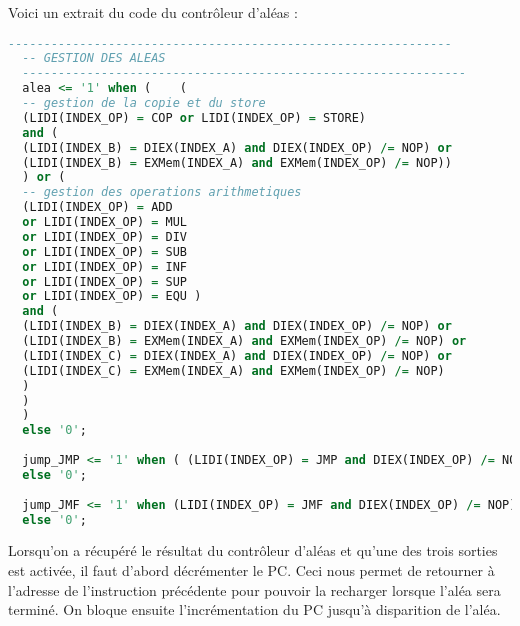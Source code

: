 Voici un extrait du code du contrôleur d'aléas :
\begin{lstlisting}[language=VHDL]
  --------------------------------------------------------------
  -- GESTION DES ALEAS
  --------------------------------------------------------------
  alea <= '1' when (	(
  -- gestion de la copie et du store
  (LIDI(INDEX_OP) = COP or LIDI(INDEX_OP) = STORE)
  and (
  (LIDI(INDEX_B) = DIEX(INDEX_A) and DIEX(INDEX_OP) /= NOP) or
  (LIDI(INDEX_B) = EXMem(INDEX_A) and EXMem(INDEX_OP) /= NOP))
  ) or (
  -- gestion des operations arithmetiques
  (LIDI(INDEX_OP) = ADD
  or LIDI(INDEX_OP) = MUL
  or LIDI(INDEX_OP) = DIV
  or LIDI(INDEX_OP) = SUB
  or LIDI(INDEX_OP) = INF 
  or LIDI(INDEX_OP) = SUP
  or LIDI(INDEX_OP) = EQU )
  and (
  (LIDI(INDEX_B) = DIEX(INDEX_A) and DIEX(INDEX_OP) /= NOP) or
  (LIDI(INDEX_B) = EXMem(INDEX_A) and EXMem(INDEX_OP) /= NOP) or
  (LIDI(INDEX_C) = DIEX(INDEX_A) and DIEX(INDEX_OP) /= NOP) or
  (LIDI(INDEX_C) = EXMem(INDEX_A) and EXMem(INDEX_OP) /= NOP)
  )
  )
  )
  else '0';
  
  jump_JMP <= '1' when ( (LIDI(INDEX_OP) = JMP and DIEX(INDEX_OP) /= NOP) or DIEX(INDEX_OP) = JMP or EXMem(INDEX_OP) = JMP )
  else '0';
  
  jump_JMF <= '1' when (LIDI(INDEX_OP) = JMF and DIEX(INDEX_OP) /= NOP) or DIEX(INDEX_OP) = JMF or EXMem(INDEX_OP) = JMF
  else '0';
\end{lstlisting}

Lorsqu'on a récupéré le résultat du contrôleur d'aléas et qu'une des trois sorties est activée, il faut d'abord décrémenter le PC. Ceci nous permet de retourner à l'adresse de l'instruction précédente pour pouvoir la recharger lorsque l'aléa sera terminé. On bloque ensuite l'incrémentation du PC jusqu'à disparition de l'aléa.